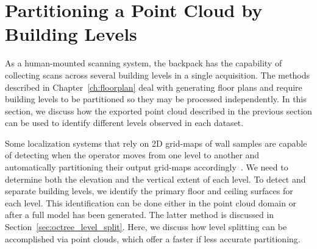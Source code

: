 \documentclass[12pt,onecolumn,oneside]{book}
\begin{document}
\section{Partitioning a Point Cloud by Building Levels}
\label{sec:pointcloud_level_split}

As a human-mounted scanning system, the backpack has the capability of collecting scans across several building levels in a single acquisition.  The methods described in Chapter~\ref{ch:floorplan} deal with generating floor plans and require building levels to be partitioned so they may be processed independently.  In this section, we discuss how the exported point cloud described in the previous section can be used to identify different levels observed in each dataset.


Some localization systems that rely on 2D grid-maps of wall samples are capable of detecting when the operator moves from one level to another and automatically partitioning their output grid-maps accordingly~\cite{MITBackpack}.  We need to determine both the elevation and the vertical extent of each level.  To detect and separate building levels, we identify the primary floor and ceiling surfaces for each level.  This identification can be done either in the point cloud domain or after a full model has been generated.  The latter method is discussed in Section~\ref{sec:octree_level_split}.  Here, we discuss how level splitting can be accomplished via point clouds, which offer a faster if less accurate partitioning.
\end{document}
